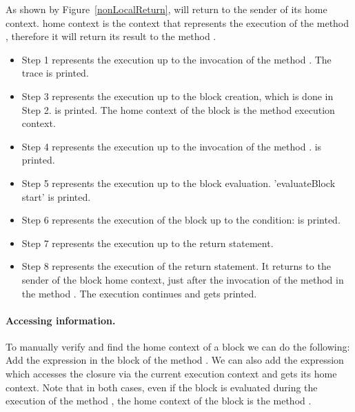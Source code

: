 \documentclass[a4paper,10pt,twoside]{book}
\begin{document}
As shown by Figure~\ref{nonLocalReturn}, \ct{[^33]} will return to the sender of its home context. \ct{[^33]} home context is the context that represents the execution of the method , therefore it will return its result to the method .

\begin{itemize}
\item Step 1 represents the execution up to the invocation of the
  method . The trace  is printed.

\item Step 3 represents the execution up to the block creation, which
  is done in Step 2.  is printed. The home context
  of the block is the  method execution context.

\item Step 4 represents the execution up to the invocation of the method
  .  is printed.

\item Step 5 represents the execution up to the block evaluation.
  'evaluateBlock start' is printed.

\item Step 6 represents the execution of the block up to the
  condition:  is printed.

\item Step 7 represents the execution up to the return statement.

\item Step 8 represents the execution of the return statement. It
  returns to the sender of the block home context, \ie just after the
  invocation of the method  in the method . The
  execution continues and  gets printed.
\end{itemize}



\paragraph{Accessing information.} 

To manually verify and find the home context of a block we can do the following: Add the expression  in the block of the  method . We can also add the expression  which accesses the closure via the current execution context and gets its home context. Note that in both cases, even if the block is evaluated during the execution of the method , the home context of the block is the method .
\end{document}
